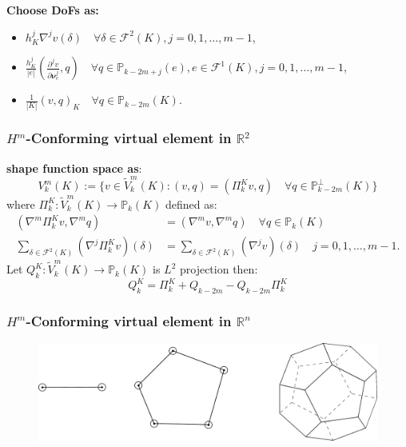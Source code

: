 \documentclass[notheorems,serif]{beamer}
\begin{document}
\begin{CJK}{UTF8}{gkai}
\begin{frame}
\bf{Choose DoFs as}:
\begin{itemize}
    \item $h_K^j \nabla^{j}v(\delta) \quad \forall \delta \in \mathcal{F}^2(K),
        j = 0, 1, \dots, m-1$,
    \item $\frac{h_K^j}{|e|}(\frac{\partial^j v}{\partial \boldsymbol{\nu}_e^j}, q) \quad 
        \forall q \in \mathbb{P}_{k-2m+j}(e), e \in \mathcal{F}^1(K), 
        j = 0, 1, \dots, m-1$,
    \item $\frac{1}{|K|}(v, q)_K \quad \forall q \in \mathbb{P}_{k-2m}(K)$. 
\end{itemize}
\end{frame}

\begin{frame}
\frametitle{$H^m$-Conforming virtual element in $\mathbb{R}^2$}
    \textbf{shape function space as}:
    $$
    V_k^m(K) := \{v \in \widetilde{V}_k^m(K): (v, q) = (\Pi_k^Kv, q) \quad 
        \forall q \in \mathbb{P}_{k-2m}^{\perp}(K)\}
    $$
    where $\Pi_k^K : \widetilde{V}_k^m(K) \to \mathbb{P}_k(K)$ defined as:
    $$
    \begin{aligned}
        (\nabla^m \Pi_k^K v, \nabla^m q) &  = (\nabla^m v, \nabla^m q) \quad
        \forall q \in \mathbb{P}_k(K)\\
        \sum_{\delta\in\mathcal{F}^2(K)}(\nabla^j\Pi_k^K v)(\delta) & = 
        \sum_{\delta\in\mathcal{F}^2(K)}(\nabla^j v)(\delta) \quad j = 0, 1,
        \dots, m-1.
    \end{aligned}
    $$
    Let $Q_k^K : \widetilde{V}_k^m(K) \to \mathbb{P}_k(K)$ is $L^2$ projection
    then:
    $$
    Q_k^K = \Pi_k^K + Q_{k-2m} - Q_{k-2m}\Pi_k^K 
    $$
\end{frame}
\begin{frame}
    \frametitle{$H^m$-Conforming virtual element in $\mathbb{R}^n$}
    \begin{figure}[H]
        \centering
        \includegraphics[scale=0.3]{../figures/bitmap.pdf}
    \end{figure}
\end{frame}


\end{CJK}
\end{document}

